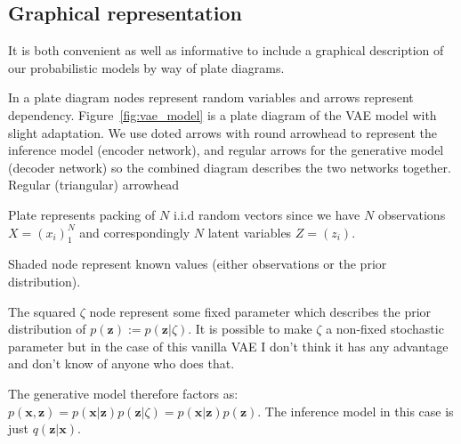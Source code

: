 \documentclass[11pt, a4paper]{report}
\theoremstyle{plain}
\theoremstyle{definition}
\theoremstyle{remark}
\newcommand{\x}{\mathbf{x}}
\newcommand{\z}{\mathbf{z}}
\begin{document}
\subsection{Graphical representation}

It is both convenient as well as informative to include a graphical description
of our probabilistic models by way of plate diagrams.

In a plate diagram nodes represent random variables and arrows
represent dependency.
Figure~\ref{fig:vae_model} is a plate diagram of the VAE model with slight
adaptation. We use doted arrows with round arrowhead to represent the inference model
(encoder network),
and regular arrows for the generative model (decoder network) so the combined
diagram describes the two networks together.
Regular (triangular) arrowhead

Plate represents packing of $N$ i.i.d random vectors since we have $N$ observations $X =
(x_i)_1^N$ and correspondingly $N$ latent variables $Z = (z_i)$.

Shaded node represent known values (either observations or the prior
distribution).

The squared $\zeta$ node represent some fixed parameter which describes the
prior distribution of $p(\z) := p(\z | \zeta)$.
It is possible to make $\zeta$ a non-fixed stochastic parameter but in the case of this
vanilla VAE I don't think it has any advantage and don't know of anyone who 
does that. 

The generative model therefore factors as: $p(\x,\z) = p(\x|\z)p(\z|\zeta) =
p(\x|\z)p(\z)$.
The inference model in this case is just $q(\z | \x)$.
\end{document}
